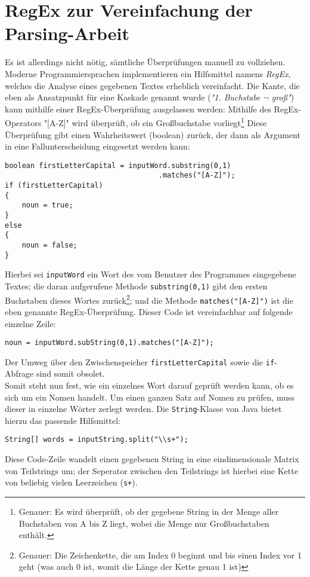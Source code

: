 \documentclass[12pt,twoside]{article}
\theoremstyle{plain}
\theoremstyle{definition}
\theoremstyle{remark}
\begin{document}
\section{RegEx zur Vereinfachung der Parsing-Arbeit}
\label{sec:regex}
Es ist allerdings nicht nötig, sämtliche Überprüfungen manuell zu vollziehen.
Moderne Programmiersprachen implementieren ein Hilfsmittel namens \textit{RegEx}, welches die Analyse eines gegebenen Textes erheblich vereinfacht.
Die Kante, die eben als Ansatzpunkt für eine Kaskade genannt wurde (\textit{"1. Buchstabe $\lnot$ groß"}) kann mithilfe einer RegEx-Überprüfung ausgelassen werden: Mithilfe des RegEx-Operators "[A-Z]" wird überprüft, ob ein Großbuchstabe vorliegt\footnote{Genauer: Es wird überprüft, ob der gegebene String in der Menge aller Buchstaben von A bis Z liegt, wobei die Menge nur Großbuchstaben enthält.}
Diese Überprüfung gibt einen Wahrheitswert (boolean) zurück, der dann als Argument in eine Fallunterscheidung eingesetzt werden kann:
\begin{lstlisting}
boolean firstLetterCapital = inputWord.substring(0,1)
									.matches("[A-Z]");
if (firstLetterCapital)
{
	noun = true;
}
else
{
	noun = false;
}
\end{lstlisting}
Hierbei sei \texttt{inputWord} ein Wort des vom Benutzer des Programmes eingegebene Textes; die daran aufgerufene Methode \texttt{substring(0,1)} gibt den ersten Buchstaben dieses Wortes zurück\footnote{Genauer: Die Zeichenkette, die am Index 0 beginnt und bis einen Index vor 1 geht (was auch 0 ist, womit die Länge der Kette genau 1 ist)}; und die Methode \texttt{matches("[A-Z]")} ist die eben genannte RegEx-Überprüfung.
Dieser Code ist vereinfachbar auf folgende einzelne Zeile:
\begin{lstlisting}
noun = inputWord.subString(0,1).matches("[A-Z]");
\end{lstlisting}
Der Umweg über den Zwischenspeicher \texttt{firstLetterCapital} sowie die \texttt{if}-Abfrage sind somit obsolet.\\
Somit steht nun fest, wie ein einzelnes Wort darauf geprüft werden kann, ob es sich um ein Nomen handelt.
Um einen ganzen Satz auf Nomen zu prüfen, muss dieser in einzelne Wörter zerlegt werden.
Die \texttt{String}-Klasse von Java bietet hierzu das passende Hilfsmittel:
\begin{lstlisting}
String[] words = inputString.split("\\s+");
\end{lstlisting}
Diese Code-Zeile wandelt einen gegebenen String in eine eindimensionale Matrix von Teilstrings um; der Seperator zwischen den Teilstrings ist hierbei eine Kette von beliebig vielen Leerzeichen (\texttt{s+}).
\end{document}
